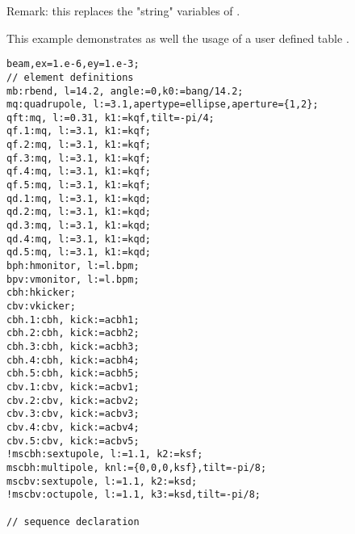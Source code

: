 Remark: this replaces the "string" variables of \madeight. 

 This example demonstrates as well the usage of a user defined table \label{ucreate}. 
\begin{verbatim}
beam,ex=1.e-6,ey=1.e-3;
// element definitions
mb:rbend, l=14.2, angle:=0,k0:=bang/14.2;
mq:quadrupole, l:=3.1,apertype=ellipse,aperture={1,2};
qft:mq, l:=0.31, k1:=kqf,tilt=-pi/4;
qf.1:mq, l:=3.1, k1:=kqf;
qf.2:mq, l:=3.1, k1:=kqf;
qf.3:mq, l:=3.1, k1:=kqf;
qf.4:mq, l:=3.1, k1:=kqf;
qf.5:mq, l:=3.1, k1:=kqf;
qd.1:mq, l:=3.1, k1:=kqd;
qd.2:mq, l:=3.1, k1:=kqd;
qd.3:mq, l:=3.1, k1:=kqd;
qd.4:mq, l:=3.1, k1:=kqd;
qd.5:mq, l:=3.1, k1:=kqd;
bph:hmonitor, l:=l.bpm;
bpv:vmonitor, l:=l.bpm;
cbh:hkicker;
cbv:vkicker;
cbh.1:cbh, kick:=acbh1;
cbh.2:cbh, kick:=acbh2;
cbh.3:cbh, kick:=acbh3;
cbh.4:cbh, kick:=acbh4;
cbh.5:cbh, kick:=acbh5;
cbv.1:cbv, kick:=acbv1;
cbv.2:cbv, kick:=acbv2;
cbv.3:cbv, kick:=acbv3;
cbv.4:cbv, kick:=acbv4;
cbv.5:cbv, kick:=acbv5;
!mscbh:sextupole, l:=1.1, k2:=ksf;
mscbh:multipole, knl:={0,0,0,ksf},tilt=-pi/8;
mscbv:sextupole, l:=1.1, k2:=ksd;
!mscbv:octupole, l:=1.1, k3:=ksd,tilt=-pi/8;

// sequence declaration


\end{verbatim}
